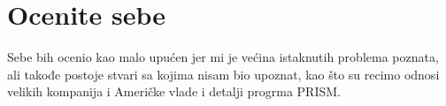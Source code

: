 \documentclass[a4paper]{report}
\begin{document}
\section{Ocenite sebe}
Sebe bih ocenio kao malo upućen jer mi je većina istaknutih problema poznata, ali takođe postoje stvari sa kojima nisam bio upoznat, kao što su recimo odnosi velikih kompanija i Američke vlade i detalji progrma PRISM.

\end{document}
